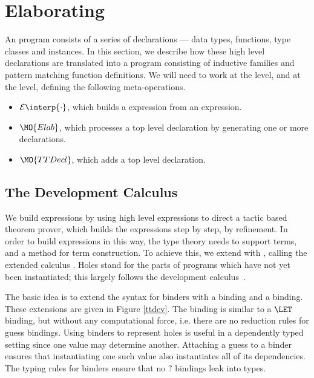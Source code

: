 \newcommand{\ttinterp}[1]{\mathcal{E}\interp{#1}}
\newcommand{\uninterp}[1]{\mathcal{U}\interp{#1}}

\section{Elaborating \Idris{}}

\label{sect:elaboration}

An \Idris{} program consists of a series of declarations --- data types,
functions, type classes and instances. In this section, we describe how these
high level declarations are translated into a \TT{} program consisting of
inductive families and pattern matching function definitions. We will need to
work at the  level, and at the  level,
defining the following meta-operations.

\begin{itemize}
\item $\ttinterp{\cdot}$, which builds a \TT{} expression from an \Idris{} expression.
\item $\MO{Elab}$, which processes a top level \Idris{} declaration by generating
one or more \TT{} declarations.
\item $\MO{TTDecl}$, which adds a top level \TT{} declaration.
\end{itemize}


\subsection{The Development Calculus \TTdev}

We build \TT{} expressions by using high level \Idris{} expressions to
direct a tactic based theorem prover, which builds the \TT{} expressions
step by step, by refinement. In order to build expressions in this way,
the type theory needs to support
 terms, and a method for term construction. 
To achieve this, we extend \TT{} with ,
calling the extended calculus \TTdev{}.
Holes stand for the parts of programs which have not yet been
instantiated; this largely follows the \Oleg{} development
calculus~\cite{McBride1999}.

The basic idea is to extend the syntax for binders with a 
binding and a  binding. 
These extensions are given in Figure \ref{ttdev}.
The  binding is
similar to a $\LET$ binding, but without any computational force,
i.e. there are no reduction rules for guess bindings. 
Using binders to represent holes is useful in a dependently typed setting since
one value may determine another. Attaching a guess to a binder ensures that
instantiating one such value also instantiates all of its dependencies. The
typing rules for binders ensure that no $?$ bindings leak into types.

